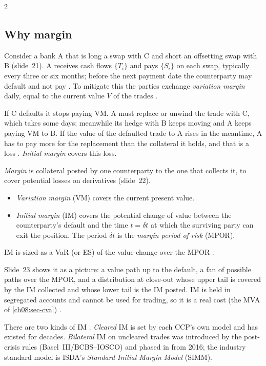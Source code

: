 \begin{paracol}{2}
\subsection{Why margin}
Consider a bank A that is long a swap with C and short an offsetting swap with B (slide~21). A receives cash flows
$\{T_i\}$ and pays $\{S_i\}$ on each swap, typically every three or six months; before the next payment date the
counterparty may default and not pay . To mitigate this the parties exchange \emph{variation
margin} daily, equal to the current value $V$ of the trades .

If C defaults it stops paying VM. A must replace or unwind the trade with C, which takes some days; meanwhile its
hedge with B keeps moving and A keeps paying VM to B. If the value of the defaulted trade to A rises in the
meantime, A has to pay more for the replacement than the collateral it holds, and that is a loss
. \emph{Initial margin} covers this loss.

\begin{definition}[Margin]
\emph{Margin} is collateral posted by one counterparty to the one that collects it, to cover potential losses on
derivatives (slide~22).
\begin{itemize}
  \item \emph{Variation margin} (VM) covers the current present value.
  \item \emph{Initial margin} (IM) covers the potential change of value between the counterparty's default and the
        time $t=\delta t$ at which the surviving party can exit the position. The period $\delta t$ is the
        \emph{margin period of risk} (MPOR).
\end{itemize}
IM is sized as a VaR (or ES) of the value change over the MPOR .
\end{definition}

Slide~23 shows it as a picture: a value path up to the default, a fan of possible paths over the MPOR, and a
distribution at close-out whose upper tail is covered by the IM collected and whose lower tail is the IM posted.
IM is held in segregated accounts and cannot be used for trading, so it is a real cost (the MVA of
\cref{ch08:sec-cva}) .

There are two kinds of IM . \emph{Cleared} IM is set by each CCP's own model and has existed for
decades. \emph{Bilateral} IM on uncleared trades was introduced by the post-crisis rules (Basel~III/BCBS--IOSCO) and
phased in from 2016; the industry standard model is ISDA's \emph{Standard Initial Margin Model} (SIMM).


\end{paracol}
